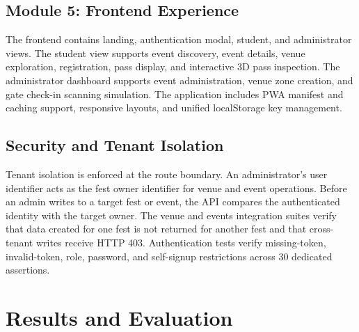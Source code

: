 \documentclass[11pt,a4paper]{report}
\begin{document}
\section{Module 5: Frontend Experience}
The frontend contains landing, authentication modal, student, and administrator views. The
student view supports event discovery, event details, venue exploration, registration,
pass display, and interactive 3D pass inspection. The administrator dashboard supports event administration, venue zone creation, and gate check-in scanning simulation. The application includes PWA
manifest and caching support, responsive layouts, and unified localStorage key management.

\section{Security and Tenant Isolation}
Tenant isolation is enforced at the route boundary. An administrator's user identifier
acts as the fest owner identifier for venue and event operations. Before an admin writes
to a target fest or event, the API compares the authenticated identity with the target owner.
The venue and events integration suites verify that data created for one fest is not returned for
another fest and that cross-tenant writes receive HTTP 403. Authentication tests verify missing-token, invalid-token, role, password, and self-signup restrictions across 30 dedicated assertions.

\chapter{Results and Evaluation}
\end{document}
